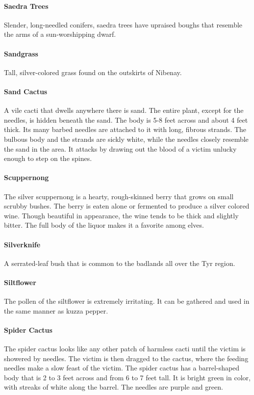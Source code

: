 \begin{multicols}{2}
\paragraph{Saedra Trees}
Slender, long-needled conifers, saedra trees have upraised boughs that
resemble the arms of a sun-worshipping dwarf.

\paragraph{Sandgrass}
Tall, silver-colored grass found on the outskirts of Nibenay.

\paragraph{Sand Cactus}
A vile cacti that dwells anywhere there is sand. The entire plant, except
for the needles, is hidden beneath the sand. The body is 5-8 feet across
and about 4 feet thick. Its many barbed needles are attached to it with
long, fibrous strands. The bulbous body and the strands are sickly white,
while the needles closely resemble the sand in the area. It attacks by
drawing out the blood of a victim unlucky enough to step on the spines.

\paragraph{Scuppernong}
The silver scuppernong is a hearty, rough-skinned berry that grows on
small scrubby bushes. The berry is eaten alone or fermented to produce a
silver colored wine. Though beautiful in appearance, the wine tends to be
thick and slightly bitter. The full body of the liquor makes it a favorite
among elves.

\paragraph{Silverknife}
A serrated-leaf bush that is common to the badlands all over the Tyr region.

\paragraph{Siltflower}
The pollen of the siltflower is extremely irritating. It can be gathered
and used in the same manner as kuzza pepper.

\paragraph{Spider Cactus}
The spider cactus looks like any other patch of harmless cacti until the
victim is showered by needles. The victim is then dragged to the cactus,
where the feeding needles make a slow feast of the victim. The spider
cactus has a barrel-shaped body that is 2 to 3 feet across and from 6 to
7 feet tall. It is bright green in color, with streaks of white along
the barrel. The needles are purple and green.


\end{multicols}
